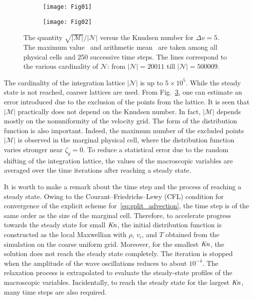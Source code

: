 \documentclass[review]{elsarticle}
\newcommand{\Kn}{\mbox{\textit{Kn}}}
\newcommand{\Nu}{\mathcal{N}}
\newcommand{\Mu}{\mathcal{M}}
\begin{document}
\begin{figure}
    \centering
    \begin{subfigure}[b]{.5\linewidth}
        \texttt{[image: Fig01]}
        \caption{}
        \label{fig:exclusions-max}
    \end{subfigure}%
    \begin{subfigure}[b]{.5\linewidth}
        \texttt{[image: Fig02]}
        \caption{}
        \label{fig:exclusions-mean}
    \end{subfigure}
    \caption{The quantity \(\sqrt{|\Mu|}/|\Nu|\) versus the Knudsen number for \(\Delta{v}=5\).
        The maximum value~ and arithmetic mean~
        are taken among all physical cells and 250 successive time steps.
        The lines correspond to the various cardinality of \(\Nu\):
        from \(|\Nu| = 20011\) till \(|\Nu| = 500009\).}
    \label{fig:exclusions}
\end{figure}

The cardinality of the integration lattice \(|\Nu|\) is up to \(5\times10^5\).
While the steady state is not reached, coarser lattices are used.
From Fig.~\ref{fig:exclusions}, one can estimate an error introduced
due to the exclusion of the points from the lattice.
It is seen that \(|\Mu|\) practically does not depend on the Knudsen number.
In fact, \(|\Mu|\) depends mostly on the nonuniformity of the velocity grid.
The form of the distribution function is also important.
Indeed, the maximum number of the excluded points \(|\Mu|\) is observed in the marginal physical cell,
where the distribution function varies stronger near \(\zeta_y=0\).
To reduce a statistical error due to the random shifting of the integration lattice,
the values of the macroscopic variables are averaged over the time iterations
after reaching a steady state.

It is worth to make a remark about the time step and the process of reaching a steady state.
Owing to the Courant--Friedrichs--Lewy (CFL) condition
for convergence of the explicit scheme for~\eqref{eq:split_advection},
the time step is of the same order as the size of the marginal cell.
Therefore, to accelerate progress towards the steady state for small \(\Kn\),
the initial distribution function is constructed as the local Maxwellian
with \(\rho\), \(v_i\), and \(T\) obtained from the simulation on the coarse uniform grid.
Moreover, for the smallest \(\Kn\), the solution does not reach the steady state completely.
The iteration is stopped when the amplitude of the wave oscillations reduces to about \(10^{-4}\).
The relaxation process is extrapolated to evaluate the steady-state profiles of the macroscopic variables.
Incidentally, to reach the steady state for the largest \(\Kn\), many time steps are also required.
\end{document}
